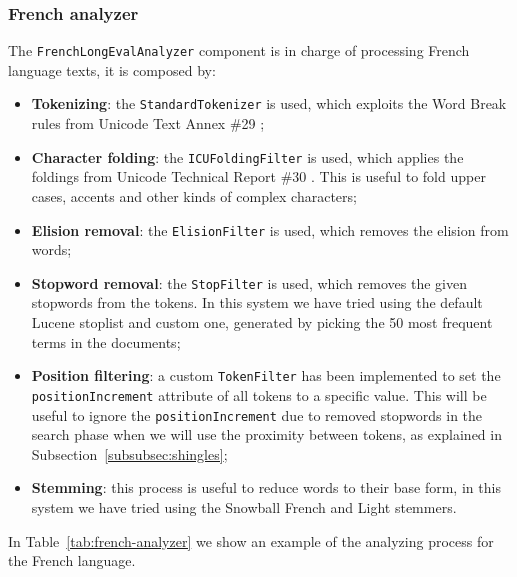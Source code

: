 \subsubsection{French analyzer}

The \texttt{FrenchLongEvalAnalyzer} component is in charge of processing French language texts, it is composed by:
\begin{itemize}
    \item \textbf{Tokenizing}: the \texttt{StandardTokenizer} is used, which exploits the Word Break rules from Unicode Text Annex \#29 \citep{UAX29};
    \item \textbf{Character folding}: the \texttt{ICUFoldingFilter} is used, which applies the foldings from Unicode Technical Report \#30 \citep{UTR30}. This is useful to fold upper cases, accents and other kinds of complex characters;
    \item \textbf{Elision removal}: the \texttt{ElisionFilter} is used, which removes the elision from words;
    \item \textbf{Stopword removal}: the \texttt{StopFilter} is used, which removes the given stopwords from the tokens. In this system we have tried using the default Lucene \citep{Lucene} stoplist and custom one, generated by picking the 50 most frequent terms in the documents;
    \item \textbf{Position filtering}: a custom \texttt{TokenFilter} has been implemented to set the \texttt{positionIncrement} attribute of all tokens to a specific value. This will be useful to ignore the \texttt{positionIncrement} due to removed stopwords in the search phase when we will use the proximity between tokens, as explained in Subsection~\ref{subsubsec:shingles};
    \item \textbf{Stemming}: this process is useful to reduce words to their base form, in this system we have tried using the Snowball French \citep{FrSnowball} and Light \citep{LightStem} stemmers.
\end{itemize}

In Table~\ref{tab:french-analyzer} we show an example of the analyzing process for the French language.

